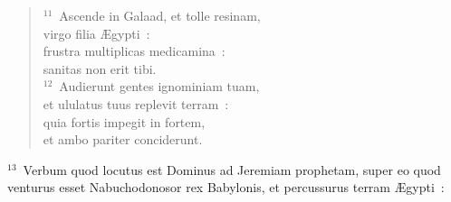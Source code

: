 \begin{flushleft}
\begin{verse}
${}^{11}$~Ascende in Galaad, et tolle resinam,\\ virgo filia \AE gypti~:\\ frustra multiplicas medicamina~:\\ sanitas non erit tibi.\\
${}^{12}$~Audierunt gentes ignominiam tuam,\\ et ululatus tuus replevit terram~:\\ quia fortis impegit in fortem,\\ et ambo pariter conciderunt.\end{verse}\end{flushleft}


${}^{13}$~Verbum quod locutus est Dominus ad Jeremiam prophetam, super eo quod venturus esset Nabuchodonosor rex Babylonis, et percussurus terram \AE gypti~:
